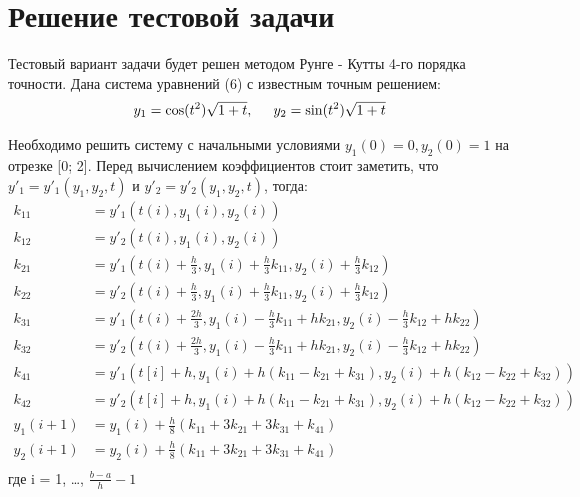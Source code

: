 \documentclass[a4paper,12pt]{article}
\begin{document}
\section{Решение тестовой задачи}
\hspace{0.5cm} Тестовый вариант задачи будет решен методом Рунге - Кутты 4-го порядка точности.
Дана система уравнений (6) с известным точным решением:
\begin{equation}
    y_1 = \cos(t^2)\sqrt{1 + t}, \hspace{0.5cm} y_2 = \sin(t^2)\sqrt{1 + t}
\end{equation}

Необходимо решить систему с начальными условиями $y_1(0) = 0, y_2(0) = 1$ на отрезке [0; 2].
Перед вычислением коэффициентов стоит заметить, что $y'_1 = y'_1(y_1, y_2, t)$ и $y'_2 = y'_2(y_1, y_2, t)$,
тогда:
\begin{align}
    k_{11} &= y'_1(t(i), y_1(i), y_2(i)) \nonumber \\
    k_{12} &= y'_2(t(i), y_1(i), y_2(i)) \nonumber \\
    k_{21} &= y'_1(t(i) + \frac{h}{3}, y_1(i) + \frac{h}{3}k_{11}, y_2(i) + \frac{h}{3} k_{12}) \nonumber \\
    k_{22} &= y'_2(t(i) + \frac{h}{3}, y_1(i) + \frac{h}{3}k_{11}, y_2(i) + \frac{h}{3} k_{12}) \nonumber \\
    k_{31} &= y'_1(t(i) + \frac{2h}{3}, y_1(i) - \frac{h}{3}k_{11} + hk_{21}, y_2(i) - \frac{h}{3}k_{12} + hk_{22}) \\
    k_{32} &= y'_2(t(i) + \frac{2h}{3}, y_1(i) - \frac{h}{3}k_{11} + hk_{21}, y_2(i) - \frac{h}{3}k_{12} + hk_{22}) \nonumber \\
    k_{41} &= y'_1(t[i] + h, y_1(i) + h (k_{11} - k_{21} + k_{31}), y_2(i) + h(k_{12} - k_{22} + k_{32})) \nonumber \\
    k_{42} &= y'_2(t[i] + h, y_1(i) + h (k_{11} - k_{21} + k_{31}), y_2(i) + h(k_{12} - k_{22} + k_{32})) \nonumber \\
    y_1(i + 1) &= y_1(i) + \frac{h}{8} (k_{11} + 3k_{21} + 3k_{31} + k_{41}) \nonumber \\
    y_2(i + 1) &= y_2(i) + \frac{h}{8} (k_{11} + 3k_{21} + 3k_{31} + k_{41}) \nonumber \\
\end{align}
где i = 1, \dots, $\frac{b-a}{h} - 1$
\end{document}
